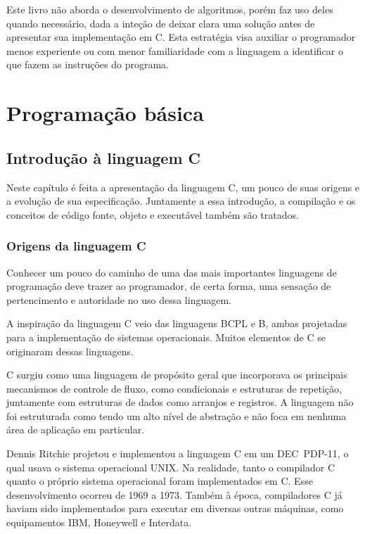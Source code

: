 \documentclass[
  11pt,
  a4paper,
]{scrbook}
\begin{document}
Este livro não aborda o desenvolvimento de algoritmos, porém faz uso
deles quando necessário, dada a inteção de deixar clara uma solução
antes de apresentar sua implementação em C. Esta estratégia visa
auxiliar o programador menos experiente ou com menor familiaridade com a
linguagem a identificar o que fazem as instruções do programa.

\part{Programação básica}

\chapter{Introdução à linguagem
C}\label{introduuxe7uxe3o-uxe0-linguagem-c}

Neste capítulo é feita a apresentação da linguagem C, um pouco de suas
origens e a evolução de sua especificação. Juntamente a essa introdução,
a compilação e os conceitos de código fonte, objeto e executável também
são tratados.

\section{Origens da linguagem C}\label{origens-da-linguagem-c}

Conhecer um pouco do caminho de uma das mais importantes linguagens de
programação deve trazer ao programador, de certa forma, uma sensação de
pertencimento e autoridade no uso dessa linguagem.

A inspiração da linguagem C veio das linguagens BCPL e B, ambas
projetadas para a implementação de sistemas operacionais. Muitos
elementos de C se originaram dessas linguagens.

C surgiu como uma linguagem de propósito geral que incorporava os
principais mecanismos de controle de fluxo, como condicionais e
estruturas de repetição, juntamente com estruturas de dados como
arranjos e registros. A linguagem não foi estruturada como tendo um alto
nível de abstração e não foca em nenhuma área de aplicação em
particular.

Dennis Ritchie projetou e implementou a linguagem C em um DEC~PDP-11, o
qual usava o sistema operacional UNIX. Na realidade, tanto o compilador
C quanto o próprio sistema operacional foram implementados em C. Esse
desenvolvimento ocorreu de 1969 a 1973. Também à época, compiladores C
já haviam sido implementados para executar em diversas outras máquinas,
como equipamentos IBM, Honeywell e Interdata.
\end{document}
